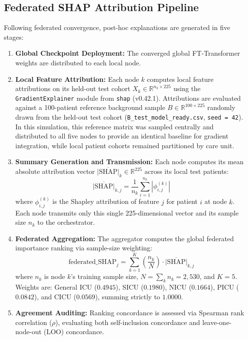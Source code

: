 \documentclass[conference,a4paper]{IEEEtran}
\begin{document}
\subsection{Federated SHAP Attribution Pipeline}
Following federated convergence, post-hoc explanations are generated in five stages:
\begin{enumerate}
\item \textbf{Global Checkpoint Deployment:} The converged global FT-Transformer weights are distributed to each local node.
\item \textbf{Local Feature Attribution:} Each node $k$ computes local feature attributions on its held-out test cohort $X_k \in \mathbb{R}^{n_k \times 225}$ using the \texttt{GradientExplainer} module from \texttt{shap} (v0.42.1). Attributions are evaluated against a 100-patient reference background sample $B \in \mathbb{R}^{100 \times 225}$ randomly drawn from the held-out test cohort (\texttt{B\_test\_model\_ready.csv}, \texttt{seed = 42}). In this simulation, this reference matrix was sampled centrally and distributed to all five nodes to provide an identical baseline for gradient integration, while local patient cohorts remained partitioned by care unit.
\item \textbf{Summary Generation and Transmission:} Each node computes its mean absolute attribution vector $\overline{|\text{SHAP}|}_k \in \mathbb{R}^{225}$ across its local test patients:
\begin{equation}
\overline{|\text{SHAP}|}_{k,j} = \frac{1}{n_k} \sum_{i=1}^{n_k} |\phi_{i,j}^{(k)}|
\end{equation}
where $\phi_{i,j}^{(k)}$ is the Shapley attribution of feature $j$ for patient $i$ at node $k$. Each node transmits only this single 225-dimensional vector and its sample size $n_k$ to the orchestrator.
\item \textbf{Federated Aggregation:} The aggregator computes the global federated importance ranking via sample-size weighting:
\begin{equation}
\text{federated\_SHAP}_j = \sum_{k=1}^{K} \left(\frac{n_k}{N}\right) \cdot \overline{|\text{SHAP}|}_{k,j}
\label{eq:agg}
\end{equation}
where $n_k$ is node $k$'s training sample size, $N = \sum_k n_k = 2{,}530$, and $K = 5$. Weights are: General ICU ($0.4945$), SICU ($0.1980$), NICU ($0.1664$), PICU ($0.0842$), and CICU ($0.0569$), summing strictly to $1.0000$.
\item \textbf{Agreement Auditing:} Ranking concordance is assessed via Spearman rank correlation ($\rho$), evaluating both self-inclusion concordance and leave-one-node-out (LOO) concordance.
\end{enumerate}
\end{document}
